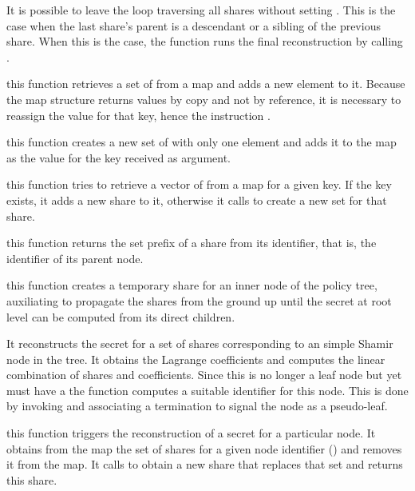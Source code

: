 \documentclass{article}
\begin{document}
\begin{description}
It is possible to leave the loop traversing all shares without setting . This is the case when the last share's parent is a descendant or a sibling of the previous share. When this is the case, the function runs the final reconstruction by calling .



\item[\code{updateSet()}] this function retrieves a set of \cST from a map and adds a new element to it. Because the map structure returns values by copy and not by reference, it is necessary to reassign the value for that key, hence the instruction .

\item[\code{addNewSet()}] this function creates a new set of \cST with only one element and adds it to the map as the value for the key received as argument.

\item[\code{putShareInSet()}] this function tries to retrieve a vector of \cST from a map for a given key. If the key exists, it adds a new share to it, otherwise it calls  to create a new set for that share.

\item[\code{getSetPrefix()}] this function returns the set prefix of a share from its identifier, that is, the identifier of its parent node.

\item[\code{detailedReconstruction()}] this function creates a temporary share for an inner node of the policy tree, auxiliating to propagate the shares from the ground up until the secret at root level can be computed from its direct children. 

It reconstructs the secret for a set of shares corresponding to an simple Shamir node in the tree. It obtains the Lagrange coefficients and computes the linear combination of shares and coefficients. Since this is no longer a leaf node but yet must have a \cST the function computes a suitable identifier for this node. This is done by invoking  and associating a  termination to signal the node as a pseudo-leaf.

\item[\code{solveSet()}] this function triggers the reconstruction of a secret for a particular node. It obtains from the map the set of shares for a given node identifier () and removes it from the map. It calls  to obtain a new share that replaces that set and returns this share.


\end{description}
\end{document}
